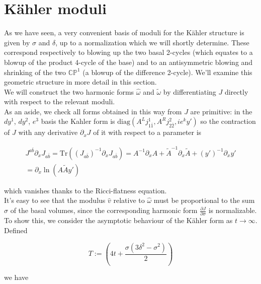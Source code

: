 \section{K\"ahler moduli}

As we have seen, a very convenient basis of moduli for the K\"ahler structure is given by $\sigma$ and $\delta$, up to a normalization which we will shortly determine. These correspond respectively to blowing up the two basal 2-cycles (which equates to a blowup of the product 4-cycle of the base) and to an antisymmetric blowing and shrinking of the two $\mathbb{CP}^1$ (a blowup of the difference 2-cycle). We'll examine this geometric structure in more detail in this section.\\

We will construct the two harmonic forms $\hat\omega$ and $\tilde\omega$ by differentiating $J$ directly with respect to the relevant moduli.\\

As an aside, we check all forms obtained in this way from $J$ are primitive: in the $dy^1$, $dy^2$, $e^3$ basis the Kahler form is $\mathrm{diag}(A^L j^1_{1\bar 1}, A^R j^2_{2\bar 2}, i e^k y')$ so the contraction of $J$ with any derivative $\partial_x J$ of it with respect to a parameter is

\begin{multline}
	J^{a\bar b}\partial_x J_{a\bar b} = \mathrm{Tr}\left( (J_{a\bar b})^{-1} \partial_x J_{a\bar b} \right) = A^{-1} \partial_x A + \tilde A^{-1} \partial_x \tilde A + (y')^{-1} \partial_x y' \\= \partial_x \ln \left( A \tilde A y' \right)	
	\label{}
\end{multline}

which vanishes thanks to the Ricci-flatness equation.\\

It's easy to see that the modulus $\hat v$ relative to $\hat \omega$ must be proportional to the sum $\sigma$ of the basal volumes, since the corresponding harmonic form $\frac{\partial J}{\partial \sigma}$ is normalizable. To show this, we consider the asymptotic behaviour of the K\"ahler form as $t\rightarrow \infty$. Defined

\begin{equation}
	T := \left( 4t + \frac{\sigma(3\delta^2 - \sigma^2)}{2} \right)
	\label{}
\end{equation}

we have


